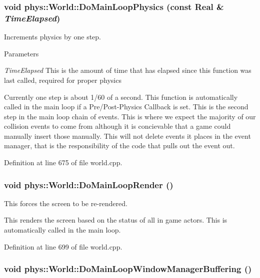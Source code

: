 \hypertarget{classphys_1_1World_a4596a7bd1dc49c3b45b5562fcd0d08f2}{
\subsubsection[{DoMainLoopPhysics}]{\setlength{\rightskip}{0pt plus 5cm}void phys::World::DoMainLoopPhysics (const {\bf Real} \& {\em TimeElapsed})}}
\label{da/ddf/classphys_1_1World_a4596a7bd1dc49c3b45b5562fcd0d08f2}


Increments physics by one step. 


\begin{DoxyParams}{Parameters}
\item[{\em TimeElapsed}]This is the amount of time that has elapsed since this function was last called, required for proper physics\end{DoxyParams}
Currently one step is about 1/60 of a second. This function is automatically called in the main loop if a Pre/Post-\/Physics Callback is set. This is the second step in the main loop chain of events. This is where we expect the majority of our collision events to come from although it is concievable that a game could manually insert those manually. This will not delete events it places in the event manager, that is the responsibility of the code that pulls out the event out. 

Definition at line 675 of file world.cpp.

\hypertarget{classphys_1_1World_a34133dd084f575a51209458dbe9ecdac}{
\subsubsection[{DoMainLoopRender}]{\setlength{\rightskip}{0pt plus 5cm}void phys::World::DoMainLoopRender ()}}
\label{da/ddf/classphys_1_1World_a34133dd084f575a51209458dbe9ecdac}


This forces the screen to be re-\/rendered. 

This renders the screen based on the status of all in game actors. This is automatically called in the main loop. 

Definition at line 699 of file world.cpp.

\hypertarget{classphys_1_1World_af7bc68e5a19fd4c9c8cc2437485096e1}{
\subsubsection[{DoMainLoopWindowManagerBuffering}]{\setlength{\rightskip}{0pt plus 5cm}void phys::World::DoMainLoopWindowManagerBuffering ()}}
\label{da/ddf/classphys_1_1World_af7bc68e5a19fd4c9c8cc2437485096e1}


